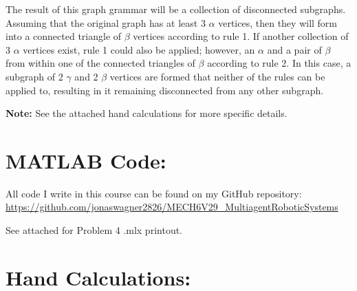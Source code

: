 \documentclass[]{article}
\numberwithin{equation}{section}
\begin{document}
The result of this graph grammar will be a collection of disconnected subgraphs. 
Assuming that the original graph has at least 3 $\alpha$ vertices, then they will form into a connected triangle of $\beta$ vertices according to rule 1.
If another collection of 3 $\alpha$ vertices exist, rule 1 could also be applied; however, an $\alpha$ and a pair of $\beta$ from within one of the connected triangles of $\beta$ according to rule 2. 
In this case, a subgraph of 2 $\gamma$ and 2 $\beta$ vertices are formed that neither of the rules can be applied to, resulting in it remaining disconnected from any other subgraph.

\textbf{Note:} 
See the attached hand calculations for more specific details.




\newpage
\appendix
\section{MATLAB Code:}\label{apx:matlab}
All code I write in this course can be found on my GitHub repository:\\
\href{https://github.com/jonaswagner2826/MECH6V29_MultiagentRoboticSystems}{https://github.com/jonaswagner2826/MECH6V29\_MultiagentRoboticSystems}


See attached for Problem 4 .mlx printout.


\section{Hand Calculations:}\label{apx:hand_calc}
% 



% 

\end{document}
